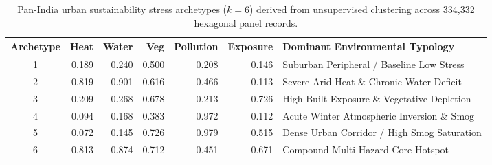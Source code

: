 \begin{table}[t]
\centering
\small
\caption{Pan-India urban sustainability stress archetypes ($k = 6$) derived from unsupervised clustering across 334,332 hexagonal panel records.}
\label{tab:archetype_profiles}
\begin{tabularx}{\textwidth}{@{}c r r r r r X@{}}
\toprule
\textbf{Archetype} & \textbf{Heat} & \textbf{Water} & \textbf{Veg} & \textbf{Pollution} & \textbf{Exposure} & \textbf{Dominant Environmental Typology} \\
\midrule
1 & 0.189 & 0.240 & 0.500 & 0.208 & 0.146 & Suburban Peripheral / Baseline Low Stress \\
2 & 0.819 & 0.901 & 0.616 & 0.466 & 0.113 & Severe Arid Heat \& Chronic Water Deficit \\
3 & 0.209 & 0.268 & 0.678 & 0.213 & 0.726 & High Built Exposure \& Vegetative Depletion \\
4 & 0.094 & 0.168 & 0.383 & 0.972 & 0.112 & Acute Winter Atmospheric Inversion \& Smog \\
5 & 0.072 & 0.145 & 0.726 & 0.979 & 0.515 & Dense Urban Corridor / High Smog Saturation \\
6 & 0.813 & 0.874 & 0.712 & 0.451 & 0.671 & Compound Multi-Hazard Core Hotspot \\
\bottomrule
\end{tabularx}
\end{table}
